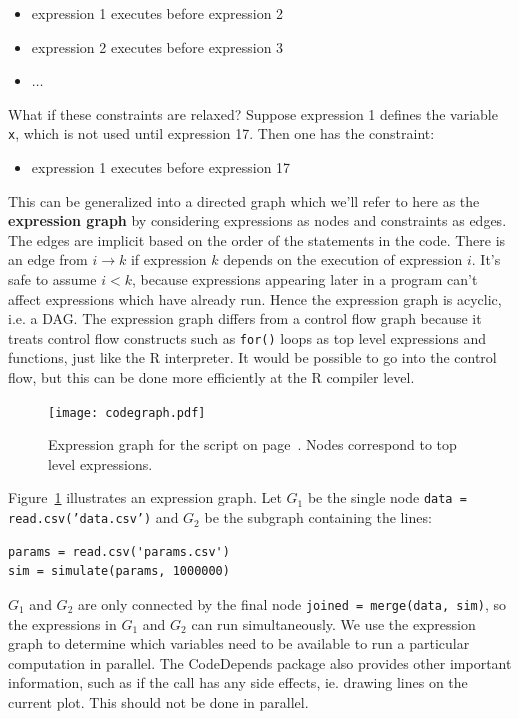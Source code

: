 \documentclass[12pt]{article}
\begin{document}
\begin{itemize}
    \item expression 1 executes before expression 2
    \item expression 2 executes before expression 3
    \item $\dots$
\end{itemize}
What if these constraints are relaxed? Suppose expression 1 defines the variable
\texttt{x}, which is not used until expression 17. Then one has the
constraint:
\begin{itemize}
    \item expression 1 executes before expression 17
\end{itemize}
This can be generalized into a directed graph which we'll refer to here as
the \textbf{expression graph} by considering expressions as
nodes and constraints as edges. The edges are implicit based on the order
of the statements in the code. There is an edge from $i \rightarrow k$ if
expression $k$ depends on the execution of expression $i$.  It's safe to
assume $i < k$, because expressions appearing later in a program can't
affect expressions which have already run. Hence the expression graph is
acyclic, i.e. a DAG. The expression graph differs from a control flow
graph because it treats control flow constructs such as \texttt{for()}
loops as top level expressions and functions, just like the R interpreter.
It would be possible to go into the control flow, but this can be done more
efficiently at the R compiler level.



\begin{figure}
  \centering
  \texttt{[image: codegraph.pdf]}
  \caption{Expression graph for the script on
  page~\pageref{list:simple}. Nodes correspond to top level expressions.}
  \label{fig:codegraph}
\end{figure}

Figure~\ref{fig:codegraph} illustrates an expression graph.
Let $G_1$ be the single node \texttt{data = read.csv('data.csv')} and $G_2$ be the subgraph containing the lines:
\begin{verbatim}
params = read.csv('params.csv')
sim = simulate(params, 1000000)
\end{verbatim}
$G_1$ and $G_2$ are only connected by the final node \texttt{joined =
merge(data, sim)}, so the expressions in $G_1$ and $G_2$ can run
simultaneously.  We use the expression graph to determine which variables
need to be available to run a particular computation in parallel. The
CodeDepends package also provides other important information, such as if
the call has any side effects, ie. drawing lines on the current plot. This
should not be done in parallel.
\end{document}
